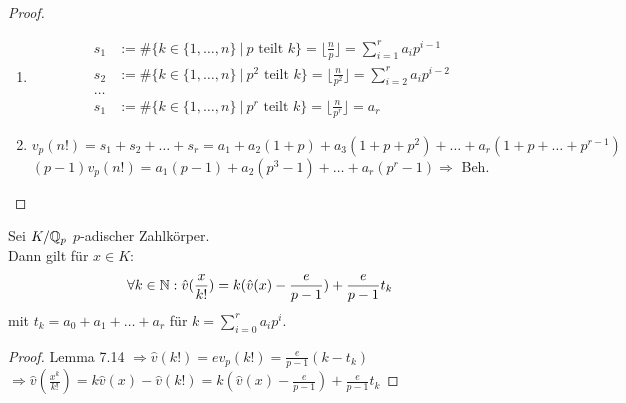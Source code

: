 \begin{proof}
\begin{enumerate}[(1)]
\item \begin{align*}
s_1&:=\#\{k \in \{1, \dots, n\} \ | \ p \text{ teilt } k \} = \lfloor \frac{n}{p} \rfloor = \sum_{i=1}^r a_i p^{i-1}\\
s_2&:=\#\{k \in \{1, \dots, n\} \ | \ p^2 \text{ teilt } k \} = \lfloor \frac{n}{p^2} \rfloor = \sum_{i=2}^r a_i p^{i-2}\\
\dots\\
s_1&:=\#\{k \in \{1, \dots, n\} \ | \ p^r \text{ teilt } k \} = \lfloor \frac{n}{p^r} \rfloor = a_r
\end{align*}
\item $v_p(n!)=s_1+s_2+\dots + s_r = a_1+a_2(1+p)+a_3(1+p+p^2)+\dots+a_r(1+p+\dots+p^{r-1})$\\
$(p-1)v_p(n!)=a_1(p-1)+a_2(p^3-1)+\dots+a_r(p^r-1) \Rightarrow$ Beh.
\end{enumerate}
\end{proof}

\begin{Lem}
Sei $K/\mathbb{Q}_p$ $p$-adischer Zahlkörper.\\
Dann gilt für $x \in K:$
\[\forall k \in \mathbb{N}: \hat v (\frac{x}{k!})=k(\hat v(x)-\frac{e}{p-1}) + \frac{e}{p-1}t_k\]
mit $t_k=a_0+a_1+\dots+a_r$ für $k=\sum_{i=0}^r a_i p^i$.
\end{Lem}

\begin{proof}
Lemma 7.14 $\Rightarrow \hat{v}(k!)= e v_p(k!)=\frac{e}{p-1}(k-t_k)$\\
$\Rightarrow \hat{v}(\frac{x^k}{k!})=k \hat{v}(x)-\hat{v}(k!)=k(\hat{v}(x)-\frac{e}{p-1})+\frac{e}{p-1}t_k$
\end{proof}

